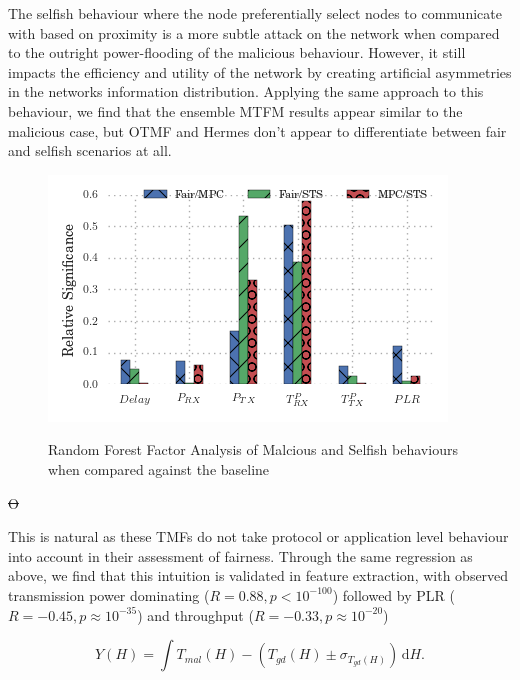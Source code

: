 \documentclass[conference]{IEEEtran}
\providecommand{\DIFdel}[1]{{\protect\color{red}\sout{#1}}}                      %
\providecommand{\DIFdelbegin}{} %
\providecommand{\DIFdelend}{} %
\begin{document}
The selfish behaviour where the node preferentially select nodes to communicate with based on proximity is a more subtle attack on the network when compared to the outright power-flooding of the malicious behaviour.
However, it still impacts the efficiency and utility of the network by creating artificial asymmetries in the networks information distribution.
Applying the same approach to this behaviour, we find that the ensemble MTFM results appear similar to the malicious case, but OTMF and Hermes don't appear to differentiate between fair and selfish scenarios at all.

\begin{figure}
  \centering
  \includegraphics[width=0.95\linewidth]{img/MaliciousSelfishMetricFactors}\label{fig:malselfactors}
  \caption{Random Forest Factor Analysis of Malcious and Selfish behaviours when compared against the baseline}
\end{figure}
\DIFdelbegin \DIFdel{O
}\DIFdelend 

This is natural as these TMFs do not take protocol or application level behaviour into account in their assessment of fairness.
Through the same regression as above, we find that this intuition is validated in feature extraction, with observed transmission power dominating ($R=0.88, p<10^{-100}$) followed by PLR ($R=-0.45, p\approx10^{-35}$) and throughput ($R=-0.33, p\approx10^{-20}$)

\begin{equation}
  Y(H) = \int \! T_{mal}(H) - (T_{gd}(H)\pm\sigma_{T_{gd}(H)})\, \mathrm{d}H.
  \label{eq:regression_target}
\end{equation}
\end{document}
